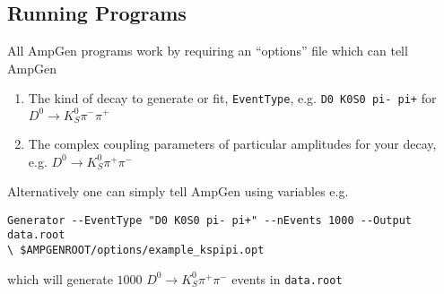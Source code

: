 \documentclass{article}
\begin{document}
\subsection{Running Programs}
All AmpGen programs work by requiring an ``options'' file which can tell AmpGen 
\begin{enumerate}
    \item The kind of decay to generate or fit, \texttt{EventType}, e.g. \texttt{D0 K0S0 pi- pi+} for $D^0 \to K_S^0 \pi^- \pi^+$
    \item The complex coupling parameters of particular amplitudes for your decay, e.g. $D^0 \to K_S^0 \pi^+ \pi^-$
\end{enumerate}
Alternatively one can simply tell AmpGen using variables e.g. 
\begin{lstlisting}
Generator --EventType "D0 K0S0 pi- pi+" --nEvents 1000 --Output data.root 
\ $AMPGENROOT/options/example_kspipi.opt
\end{lstlisting}
which will generate $1000$ $D^0 \to K_S^0 \pi^+ \pi^-$ events in \texttt{data.root} 
\end{document}
